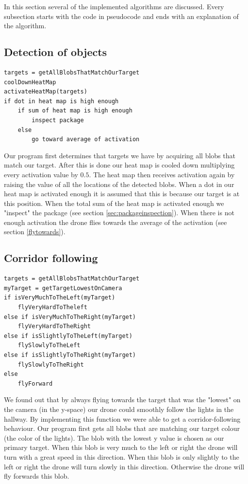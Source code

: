 \documentclass[a4paper,10pt]{article}
\begin{document}
In this section several of the implemented algorithms are discussed. Every subsection starts with the code in pseudocode and ends with an explanation of the algorithm. 
\subsection{Detection of objects}
\begin{verbatim}
targets = getAllBlobsThatMatchOurTarget
coolDownHeatMap
activateHeatMap(targets)
if dot in heat map is high enough
    if sum of heat map is high enough
        inspect package
    else
        go toward average of activation
\end{verbatim}
Our program first determines that targets we have by acquiring all blobs that match our target.
After this is done our heat map is cooled down multiplying every activation value by $0.5$. 
The heat map then receives activation again by raising the value of all the locations of the detected blobs. 
When a dot in our heat map is activated enough it is assumed that this is because our target is at this position. 
When the total sum of the heat map is activated enough we "inspect" the package (see section \ref{sec:packageinspection}). 
When there is not enough activation the drone flies towards the average of the activation (see section \ref{flytowards}).



\subsection{Corridor following} 
\label{sec:corridorfollowing}
\begin{verbatim}
targets = getAllBlobsThatMatchOurTarget
myTarget = getTargetLowestOnCamera
if isVeryMuchToTheLeft(myTarget)
    flyVeryHardToTheleft
else if isVeryMuchToTheRight(myTarget)
    flyVeryHardToTheRight
else if isSlightlyToTheLeft(myTarget)
    flySlowlyToTheLeft
else if isSlightlyToTheRight(myTarget)
    flySlowlyToTheRight
else
    flyForward
\end{verbatim}

We found out that by always flying towards the target that was the "lowest" on the camera (in the y-space) our drone could smoothly follow the lights in the hallway. 
By implementing this function we were able to get a corridor-following behaviour. 
Our program first gets all blobs that are matching our target colour (the color of the lights). 
The blob with the lowest y value is chosen as our primary target. 
When this blob is very much to the left or right the drone will turn with a great speed in this direction. 
When this blob is only slightly to the left or right the drone will turn slowly in this direction. 
Otherwise the drone will fly forwards this blob. 
\end{document}
